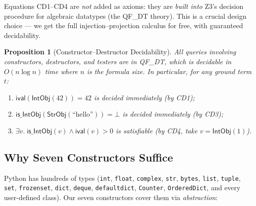 \documentclass[11pt,a4paper]{report}
\theoremstyle{definition}
\theoremstyle{plain}
\newtheorem{proposition}[definition]{Proposition}
\begin{document}
Equations CD1--CD4 are \emph{not} added as axioms: they are
\emph{built into} Z3's decision procedure for algebraic datatypes
(the QF\_DT theory).  This is a crucial design choice --- we get the
full injection--projection calculus for free, with guaranteed
decidability.

\begin{proposition}[Constructor--Destructor Decidability]
All queries involving constructors, destructors, and testers are in
QF\_DT, which is decidable in $O(n \log n)$ time where $n$ is the
formula size.  In particular, for any ground term $t$:
\begin{enumerate}
  \item $\mathsf{ival}(\mathsf{IntObj}(42)) = 42$ is decided
    immediately (by CD1);
  \item $\mathsf{is\_IntObj}(\mathsf{StrObj}(\text{``hello''})) = \bot$
    is decided immediately (by CD3);
  \item $\exists v.\; \mathsf{is\_IntObj}(v) \land \mathsf{ival}(v)
    > 0$ is satisfiable (by CD4, take $v = \mathsf{IntObj}(1)$).
\end{enumerate}
\end{proposition}

\subsection{Why Seven Constructors Suffice}

Python has hundreds of types (\texttt{int}, \texttt{float},
\texttt{complex}, \texttt{str}, \texttt{bytes}, \texttt{list},
\texttt{tuple}, \texttt{set}, \texttt{frozenset}, \texttt{dict},
\texttt{deque}, \texttt{defaultdict}, \texttt{Counter},
\texttt{OrderedDict}, and every user-defined class).  Our seven
constructors cover them via \emph{abstraction}:
\end{document}
